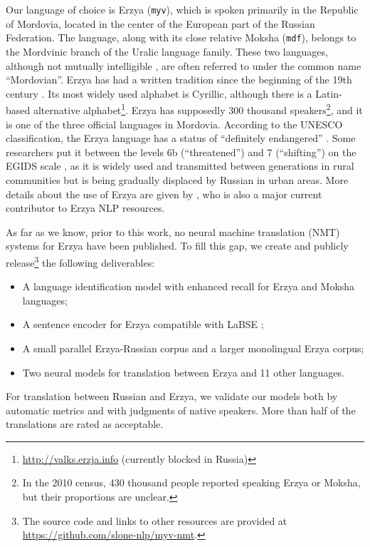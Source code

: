 \documentclass[11pt]{article}
\begin{document}
Our language of choice is Erzya (\texttt{myv}), which is spoken primarily in the Republic of Mordovia, located in the center of the European part of the Russian Federation. The language, along with its close relative Moksha (\texttt{mdf}), belongs to the Mordvinic branch of the Uralic language family. These two languages, although not mutually intelligible \cite{janurik2017erzya}, are often referred to under the common name ``Mordovian''. Erzya has had a written tradition since the beginning of the 19th century \cite{rueter2013erzya}. Its most widely used alphabet is Cyrillic, although there is a Latin-based alternative alphabet\footnote{\url{http://valks.erzja.info} (currently blocked in Russia)}. Erzya has supposedly 300 thousand speakers\footnote{In the 2010 census, 430 thousand people reported speaking Erzya or Moksha, but their proportions are unclear.}, and it is one of the three official languages in Mordovia. According to the UNESCO classification, the Erzya language has a status of ``definitely endangered'' \cite{unesco_atlas}. Some researchers \cite{janurik2017erzya} put it between the levels 6b (``threatened'') and 7 (``shifting'') on the EGIDS scale \cite{lewis2010assessing}, as it is widely used and transmitted between generations in rural communities but is being gradually displaced by Russian in urban areas.  More details about the use of Erzya are given by \citet{rueter2013erzya}, who is also a major current contributor to Erzya NLP resources.

As far as we know, prior to this work, no neural machine translation (NMT) systems for Erzya have been published. To fill this gap, we create and publicly release\footnote{The source code and links to other resources are provided at \url{https://github.com/slone-nlp/myv-nmt}. } the following deliverables:
\begin{itemize}
    \item A language identification model with enhanced recall for Erzya and Moksha languages;
    \item A sentence encoder for Erzya compatible with LaBSE \cite{feng-etal-2022-language};
    \item A small parallel Erzya-Russian corpus and a larger monolingual Erzya corpus;
    \item Two neural models for translation between Erzya and 11 other languages.
\end{itemize}

For translation between Russian and Erzya, we validate our models both by automatic metrics and with judgments  of native speakers. More than half of the translations are rated as acceptable.
\end{document}
